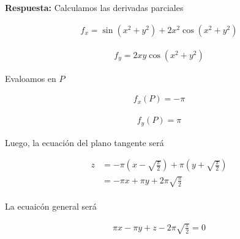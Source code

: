 \documentclass[a4paper]{article}
\begin{document}
\textbf{Respuesta: } Calculamos las derivadas parciales

\begin{align*}
    f_x = \sin(x^2+y^2) +2x^2\cos(x^2+y^2)
\end{align*}

\begin{align*}
    f_y = 2xy\cos(x^2+y^2)
\end{align*}

Evaloamos en $P$

\begin{align*}
    f_x (P) = -\pi
\end{align*}

\begin{align*}
    f_y(P) = \pi
\end{align*}

Luego, la ecuación del plano tangente será

\begin{align*}
    z &= -\pi \left( x-\sqrt{\frac{\pi}{2}}\right) +\pi \left( y+\sqrt{\frac{\pi}{2}}\right) \\
    &= -\pi x+ \pi y+2\pi\sqrt{\frac{\pi}{2}} \\
\end{align*}

La ecuaicón general será

\begin{align*}
    \pi x - \pi y +z -2\pi\sqrt{\frac{\pi}{2}} =0
\end{align*}
\end{document}
